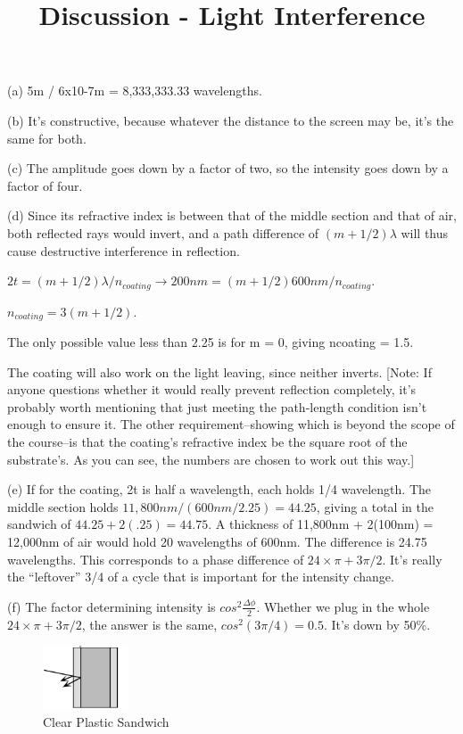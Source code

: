 \documentclass[10pt]{article}
\newenvironment{problem}[2][Problem]{\begin{trivlist}
\item[\hskip \labelsep {\bfseries #1}\hskip \labelsep {\bfseries #2.}]}{\end{trivlist}}
\begin{document}
 \title{Discussion - Light Interference}
\date{}
\maketitle

\begin{problem}{1}
\item
(a) 5m / 6x10-7m = 8,333,333.33 wavelengths.
\item
(b) It’s constructive, because whatever the distance to the screen may
be, it’s the same for both.
\item
(c) The amplitude goes down by a factor of two, so the intensity goes down by a factor of four.
\item
(d) Since its refractive index is between that of the middle section and that of air, both reflected rays would invert, and a path difference of $(m+1/2)\lambda$ will thus cause destructive interference in reflection.
\item
$2t = (m+1/2) \lambda/n_{coating} \longrightarrow 200nm = (m+1/2) 600nm/n_{coating}.$
\item
$n_{coating} = 3 (m+1/2)$.
\item The only possible value less than 2.25 is for m = 0, giving ncoating =
1.5.

\item
The coating will also work on the light leaving, since neither inverts. [Note: If anyone questions whether it would really prevent reflection completely, it’s probably worth mentioning that just meeting the path-length condition isn’t enough to ensure it. The other requirement--showing which is beyond the scope of the course--is that the coating’s refractive index be the square root of the substrate’s. As you can see, the numbers are chosen to work out this way.]

\item 
(e) If for the coating, 2t is half a wavelength, each holds 1/4 wavelength. The middle section holds $11,800nm / (600nm/2.25)=44.25$, giving a total in the sandwich of $44.25 + 2(.25)=44.75$. A thickness of 11,800nm + 2(100nm) = 12,000nm of air would hold 20 wavelengths of 600nm. The difference is 24.75 wavelengths. This corresponds to a phase difference of $24 \times \pi + 3\pi/2$. It’s really the “leftover” 3/4 of a cycle that is important for the intensity change.

\item
(f) The factor determining intensity is $cos^2\frac{\Delta \phi}{2}$. Whether we plug in the whole $24 \times \pi + 3\pi/2$, the answer is the same, $cos^2(3\pi/4)=0.5$. It’s down by 50\%.
\end{problem}

\begin{figure}[htp]
    \centering
    \includegraphics[width=1in]{sandwich_solution.png}
    \caption{Clear Plastic Sandwich}
    \label{fig:Graph of Wave}
\end{figure}






\end{document}
